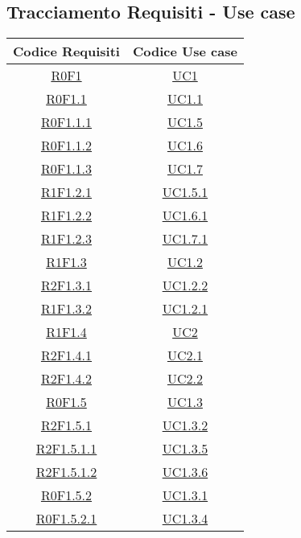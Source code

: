\subsection{Tracciamento Requisiti - Use case}
\normalsize
\begin{longtable}{|c|c|}
	\hline
	\textbf{Codice Requisiti} & \textbf{Codice Use case} \\
	\hline
	\endhead
	\hyperlink{R0F1}{R0F1} & \hyperlink{UC1}{UC1}\\
	\hline
	\hyperlink{R0F1.1}{R0F1.1} & \hyperlink{UC1.1}{UC1.1}\\
	\hline
	\hyperlink{R0F1.1.1}{R0F1.1.1} & \hyperlink{UC1.5}{UC1.5}\\
	\hline
	\hyperlink{R0F1.1.2}{R0F1.1.2} & \hyperlink{UC1.6}{UC1.6}\\
	\hline
	\hyperlink{R0F1.1.3}{R0F1.1.3} & \hyperlink{UC1.7}{UC1.7}\\
	\hline
	\hyperlink{R1F1.2.1}{R1F1.2.1} & \hyperlink{UC1.5.1}{UC1.5.1}\\
	\hline
	\hyperlink{R1F1.2.2}{R1F1.2.2} & \hyperlink{UC1.6.1}{UC1.6.1}\\
	\hline
	\hyperlink{R1F1.2.3}{R1F1.2.3} & \hyperlink{UC1.7.1}{UC1.7.1}\\
	\hline
	\hyperlink{R1F1.3}{R1F1.3} & \hyperlink{UC1.2}{UC1.2}\\
	\hline
	\hyperlink{R2F1.3.1}{R2F1.3.1} & \hyperlink{UC1.2.2}{UC1.2.2}\\
	\hline
	\hyperlink{R1F1.3.2}{R1F1.3.2} & \hyperlink{UC1.2.1}{UC1.2.1}\\
	\hline
	\hyperlink{R1F1.4}{R1F1.4} & \hyperlink{UC2}{UC2}\\
	\hline
	\hyperlink{R2F1.4.1}{R2F1.4.1} & \hyperlink{UC2.1}{UC2.1}\\
	\hline
	\hyperlink{R2F1.4.2}{R2F1.4.2} & \hyperlink{UC2.2}{UC2.2}\\
	\hline
	\hyperlink{R0F1.5}{R0F1.5} & \hyperlink{UC1.3}{UC1.3}\\
	\hline
	\hyperlink{R2F1.5.1}{R2F1.5.1} & \hyperlink{UC1.3.2}{UC1.3.2}\\
	\hline
	\hyperlink{R2F1.5.1.1}{R2F1.5.1.1} & \hyperlink{UC1.3.5}{UC1.3.5}\\
	\hline
	\hyperlink{R2F1.5.1.2}{R2F1.5.1.2} & \hyperlink{UC1.3.6}{UC1.3.6}\\
	\hline
	\hyperlink{R0F1.5.2}{R0F1.5.2} & \hyperlink{UC1.3.1}{UC1.3.1}\\
	\hline
	\hyperlink{R0F1.5.2.1}{R0F1.5.2.1} & \hyperlink{UC1.3.4}{UC1.3.4}\\
	\hline

\end{longtable}
